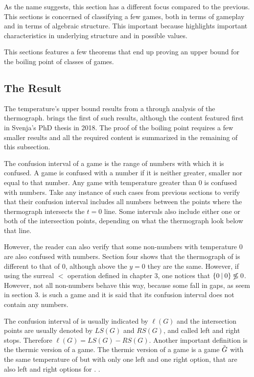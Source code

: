 As the name suggests, this section has a different focus compared to the previous. This sections is concerned of classifying a few games, both in terms of gameplay and in terms of algebraic structure. This important because highlights important characteristics in underlying structure and in possible values.

This sections features a few theorems that end up proving an upper bound for the boiling point of classes of games.

\subsection*{The Result}

The temperature's upper bound results from a through analysis of the thermograph.  brings the first of such results, although the content featured first in Svenja's PhD thesis in 2018. The proof of the boiling point requires a few smaller results and all the required content is summarized in the remaining of this subsection.

The confusion interval of a game is the range of numbers with which it is confused. A game is confused with a number if it is neither greater, smaller nor equal to that number. Any game with temperature greater than 0 is confused with numbers. Take any instance of such cases from previous sections to verify that their confusion interval includes all numbers between the points where the thermograph intersects the $t=0$ line. Some intervals also include either one or both of the intersection points, depending on what the thermograph look below that line.

However, the reader can also verify that some non-numbers with temperature 0 are also confused with numbers. Section four shows that the thermograph of  is different to that of 0, although above the $y=0$ they are the same. However, if using the surreal $<$ operation defined in chapter 3, one notices that $\mbox{$\{0\:|\:0\}$} \not\lessgtr 0$. However, not all non-numbers behave this way, because some fall in gaps, as seem in section 3.  is such a game and it is said that its confusion interval does not contain any numbers.

The confusion interval of \Gm{} is usually indicated by $\ell(G)$ and the intersection points are usually denoted by $LS(G)$ and $RS(G)$, and called left and right stops. Therefore $\ell(G) = LS(G)-RS(G)$. Another important definition is the thermic version of a game. The thermic version of a game \Gm{} is a game $\tilde{\mbox{$G$}}$ with the same temperature of \Gm{} but with only one left and one right option, that are also left and right options for \Gm{}. .

